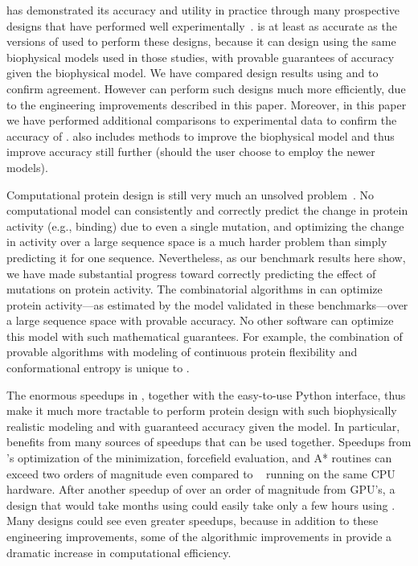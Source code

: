 \osprey has demonstrated its accuracy and utility in practice through many prospective designs that have performed well experimentally~\cite{VRC07_enhance,CFTR,runx1_cbfb,GrsA-LeuA,DHFR-PNAS,GrsA-TyrA,specific_probes}.   is at least as accurate as the versions of \osprey used to perform these designs, because it can design using the same biophysical models used in those studies, with provable guarantees of accuracy given the biophysical model.  We have compared design results using  and  to confirm agreement.  However  can perform such designs much more efficiently, due to the engineering improvements described in this paper.  Moreover, in this paper we have performed additional comparisons to experimental data to confirm the accuracy of .   also includes methods to improve the biophysical model and thus improve accuracy still further (should the user choose to employ the newer models). 

Computational protein design is still very much an unsolved problem~\cite{alg_SMB_textbook,cosb_design}.  No computational model can consistently and correctly predict the change in protein activity (e.g., binding) due to even a single mutation, and optimizing the change in activity over a large sequence space is a much harder problem than simply predicting it for one sequence.  Nevertheless, as our benchmark results here show, we have made substantial progress toward correctly predicting the effect of mutations on protein activity.  The combinatorial algorithms in \osprey can optimize protein activity---as estimated by the model validated in these benchmarks---over a large sequence space with provable accuracy.  No other software can optimize this model with such mathematical guarantees.  For example, the combination of provable algorithms with modeling of continuous protein flexibility and conformational entropy is unique to \osprey.   

The enormous speedups in , together with the easy-to-use Python interface, thus make it much more tractable to perform protein design with such biophysically realistic modeling and with guaranteed accuracy given the model.  In particular,  benefits from many sources of speedups that can be used together.  Speedups from 's optimization of the minimization, forcefield evaluation, and A* routines can exceed two orders of magnitude even compared to ~\cite{COMETS} running on the same CPU hardware.  After another speedup of over an order of magnitude from GPU's, a design that would take months using  could easily take only a few hours using .  Many designs could see even greater speedups, because in addition to these engineering improvements, some of the algorithmic improvements in  provide a dramatic increase in computational efficiency.  

